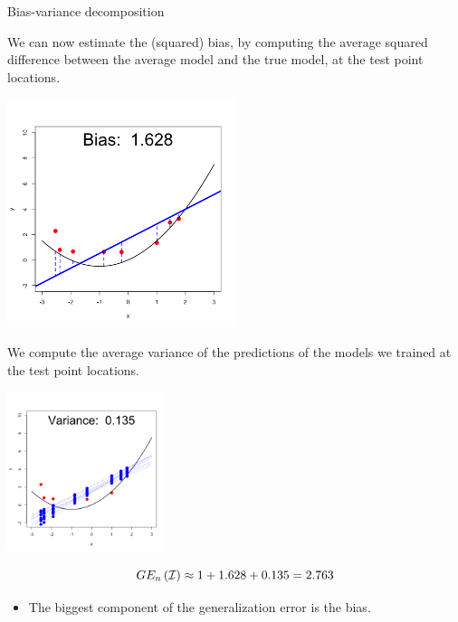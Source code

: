 \documentclass[11pt,compress,t,notes=noshow, xcolor=table]{beamer}
\begin{document}
\begin{vbframe} {Bias-variance decomposition}
\framebreak

We can now estimate the (squared) bias, by computing the average squared difference between the average model and the true model, at the test point locations.

\begin{center}
  \includegraphics[width = 0.5\textwidth]{figure/bias_variance_decomposition-linear_model_bias.png}
\end{center}

\framebreak

We compute the average variance of the predictions of the models we trained at the test point locations.
\vspace{-0.35cm}
\begin{center}
  \includegraphics[width = 0.35\textwidth]{figure/bias_variance_decomposition-linear_model_variance.png}
\end{center}
\vspace{-0.8cm}

$$GE_n\left(\mathcal{I}\right) \approx 1 + 1.628 + 0.135 = 2.763 $$


\begin{itemize}
  \item The biggest component of the generalization error is the bias.
\end{itemize}


\end{vbframe}
\end{document}
